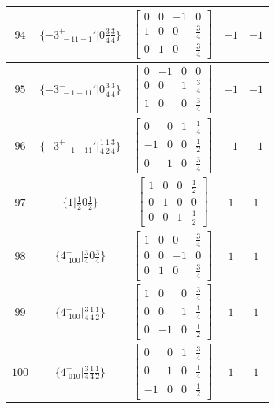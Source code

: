 \documentclass[fleqn,8pt]{jsarticle}
\begin{document}
\begin{longtable}{ccccc}
$ 94 $ & $ \{-3^{+}_{\,\,-11-1}{}'|0 \frac{3}{4} \frac{3}{4}\} $ & $ \begin{bmatrix} 0 & 0 & -1 & 0 \\ 1 & 0 & 0 & \frac{3}{4} \\ 0 & 1 & 0 & \frac{3}{4} \end{bmatrix} $ & $ -1 $ & $ -1 $ \\ \hline
$ 95 $ & $ \{-3^{-}_{\,\,-1-11}{}'|0 \frac{3}{4} \frac{3}{4}\} $ & $ \begin{bmatrix} 0 & -1 & 0 & 0 \\ 0 & 0 & 1 & \frac{3}{4} \\ 1 & 0 & 0 & \frac{3}{4} \end{bmatrix} $ & $ -1 $ & $ -1 $ \\ \hline
$ 96 $ & $ \{-3^{+}_{\,\,-1-11}{}'|\frac{1}{4} \frac{1}{2} \frac{3}{4}\} $ & $ \begin{bmatrix} 0 & 0 & 1 & \frac{1}{4} \\ -1 & 0 & 0 & \frac{1}{2} \\ 0 & 1 & 0 & \frac{3}{4} \end{bmatrix} $ & $ -1 $ & $ -1 $ \\ \hline
$ 97 $ & $ \{1|\frac{1}{2} 0 \frac{1}{2}\} $ & $ \begin{bmatrix} 1 & 0 & 0 & \frac{1}{2} \\ 0 & 1 & 0 & 0 \\ 0 & 0 & 1 & \frac{1}{2} \end{bmatrix} $ & $ 1 $ & $ 1 $ \\ \hline
$ 98 $ & $ \{4^{+}_{\,\,100}|\frac{3}{4} 0 \frac{3}{4}\} $ & $ \begin{bmatrix} 1 & 0 & 0 & \frac{3}{4} \\ 0 & 0 & -1 & 0 \\ 0 & 1 & 0 & \frac{3}{4} \end{bmatrix} $ & $ 1 $ & $ 1 $ \\ \hline
$ 99 $ & $ \{4^{-}_{\,\,100}|\frac{3}{4} \frac{1}{4} \frac{1}{2}\} $ & $ \begin{bmatrix} 1 & 0 & 0 & \frac{3}{4} \\ 0 & 0 & 1 & \frac{1}{4} \\ 0 & -1 & 0 & \frac{1}{2} \end{bmatrix} $ & $ 1 $ & $ 1 $ \\ \hline
$ 100 $ & $ \{4^{+}_{\,\,010}|\frac{3}{4} \frac{1}{4} \frac{1}{2}\} $ & $ \begin{bmatrix} 0 & 0 & 1 & \frac{3}{4} \\ 0 & 1 & 0 & \frac{1}{4} \\ -1 & 0 & 0 & \frac{1}{2} \end{bmatrix} $ & $ 1 $ & $ 1 $ \\ \hline

\end{longtable}
\end{document}
